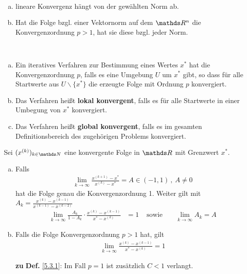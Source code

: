 \begin{Beme}~
  \begin{enumerate}[a)]
  \item  lineare Konvergenz hängt von der gewählten Norm ab.
  \item Hat die Folge bzgl. einer Vektornorm 
    auf dem $\R^n$ die Konvergenzordnung $p>1$,
    hat sie diese bzgl. jeder Norm.
  \end{enumerate}
\end{Beme}

\begin{Defe}~
  \label{5.3.4}
  \begin{enumerate}[a)]
  \item Ein iteratives Verfahren zur Bestimmung eines Wertes $x^{*}$ hat 
    die Konvergenzordnung $p$, falls es eine Umgebung $U$ um $x^{*}$ gibt, 
    so dass für alle Startwerte aus $U\backslash \{x^{*}\}$
    die erzeugte Folge mit Ordnung $p$ konvergiert.
  \item Das Verfahren heißt \textbf{lokal konvergent},
    falls es für alle Startwerte in einer Umbegung von $x^{*}$ konvergiert.
  \item Das Verfahren heißt \textbf{global konvergent},
    falls es im gesamten Definitionsbereich des zugehörigen Problems konvergiert.
  \end{enumerate}
\end{Defe} 

\begin{Leme}
  \label{5.3.5}
  Sei $(x^{(k)})_{k\in\N}$ eine konvergente Folge in $\R$ mit Grenzwert $x^{*}$.
  \begin{enumerate}[a)]
  \item Falls 
    \begin{gather}
      \lim_{k\to \infty}\frac{x^{(k+1)}-x^{*}}{x^{(k)}-x^{*}}
      = A\in (-1,1)\, ,~ A\neq 0
      \label{V.3.1}
    \end{gather}
    hat die Folge genau die Konvergenzordnung 1.
    Weiter gilt mit $A_k=\frac{x^{(k)}-x^{(k-1)}}{x^{(k-1)}-x^{(k-2)}}$
    \begin{align}
      \lim_{k\to \infty}\frac{A_k}{1-A_k}\cdot 
      \frac{x^{(k)}-x^{(k-1)}}{x^{*}-x^{(k)}}&=1 
      &\text{ sowie }&
      &\lim_{k\to\infty}A_k=A
        \label{V.3.2}
    \end{align}
  \item Falls die Folge Konvergenzordnung $p>1$ hat, gilt
    \begin{gather}
      \lim_{k\to\infty}\frac{x^{(k)}-x^{(k-1)}}{x^{*}-x^{(k)}}=1
      \label{V.3.3}
    \end{gather}
  \item[\textbf{zu}]\textbf{Def.} \ref{5.3.1}:  
    Im Fall $p=1$ ist zusätzlich $C<1 $ verlangt.
  \end{enumerate}
\end{Leme} 

